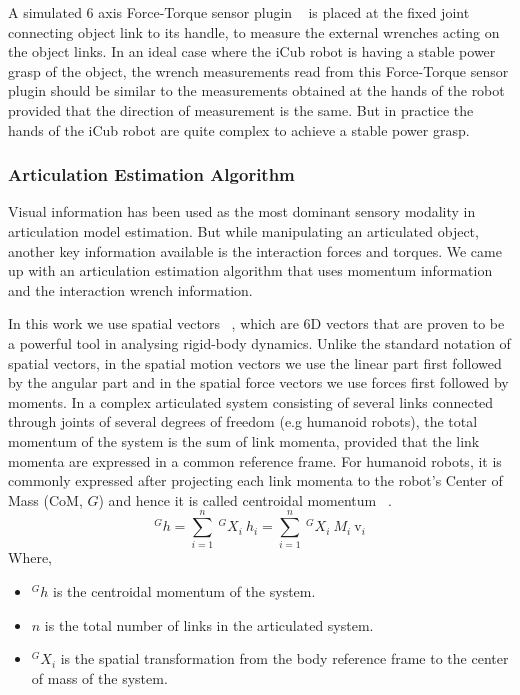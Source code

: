 \documentclass[12pt,a4paper]{report}
\begin{document}
A simulated 6 axis Force-Torque sensor plugin ~\cite{hoffman2014yarp} is placed at the fixed joint connecting object link to its handle, to measure the external wrenches acting on the object links. In an ideal case where the iCub robot is having a stable power grasp of the object, the wrench measurements read from this Force-Torque sensor plugin should be similar to the measurements obtained at the hands of the robot provided that the direction of measurement is the same. But in practice the hands of the iCub robot are quite complex to achieve a stable power grasp.

\subsubsection*{Articulation Estimation Algorithm}

Visual information has been used as the most dominant sensory modality in articulation model estimation. But while manipulating an articulated object, another key information available is the interaction forces and torques. We came up with an articulation estimation algorithm that uses momentum information and the interaction wrench information.

In this work we use spatial vectors ~\cite{featherstone2014rigid}, which are 6D vectors that are proven to be a powerful tool in analysing rigid-body dynamics. Unlike the standard notation of spatial vectors, in the spatial motion vectors we use the linear part first followed by the angular part and in the spatial force vectors we use forces first followed by moments. In a complex articulated system consisting of several links connected through joints of several degrees of freedom (e.g humanoid robots), the total momentum of the system is the sum of link momenta, provided that the link momenta are expressed in a common reference frame. For humanoid robots, it is commonly expressed after projecting each link momenta to the robot's Center of Mass (CoM, $G$) and hence it is called centroidal momentum ~\cite{orin2013centroidal}. 
\begin{equation}
  ^Gh=\sum\limits_{i=1}^n \ ^GX_i \ h_i = \sum\limits_{i=1}^n \ ^GX_i \ M_i \ \mathrm{v}_i
\end{equation}
Where, 
\begin{itemize}
  \item $^Gh$ is the centroidal momentum of the system.
  \item  $n$ is the total number of links in the articulated system.
  \item $^GX_i$ is the spatial transformation from the body reference frame to the center of mass of the system. 
\end{itemize}
\end{document}
